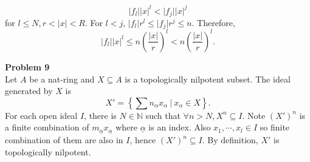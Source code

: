 \documentclass[10pt]{article}
\newcommand{\N}[0]{\mathbb{N}}
\newcommand{\sep}[0]{\:|\:}
\newcommand{\ab}[1]{\vert #1 \vert}
\begin{document}
\begin{equation*}
    \ab{f_l}\ab{x}^l<\ab{f_j}\ab{x}^j 
\end{equation*}
for $l\leq N,r<\ab{x}<R$. For $l<j$, $\ab{f_l}r^l\leq \ab{f_j}r^j\leq n$. Therefore,
\begin{equation*}
    \ab{f_l}\ab{x}^l\leq n\left({\frac {\ab{x}} {r}}\right)^l <n\left({\frac {\ab{x}} r}\right)^l.
\end{equation*}
\par\textbf{Problem 9}\\
Let $A$ be a nat-ring and $X\subseteq A$ is a topologically nilpotent subset. The ideal generated by $X$ is 
\begin{equation*}
    X' = \left\{\sum n_\alpha x_\alpha\sep x_\alpha\in X\right\}.
\end{equation*}
For each open ideal $I$, there is $N\in\N$ such that $\forall n>N,X^n\subseteq I$. Note $(X')^n$ is a finite combination of $m_{\underline{\alpha}}x_{\underline{\alpha}}$ where $\underline{\alpha}$ is an index. Also $x_1,\cdots,x_l\in I$ so finite combination of them are also in $I$, hence $(X')^n\subseteq I$. By definition, $X'$ is topologically nilpotent.
\end{document}
